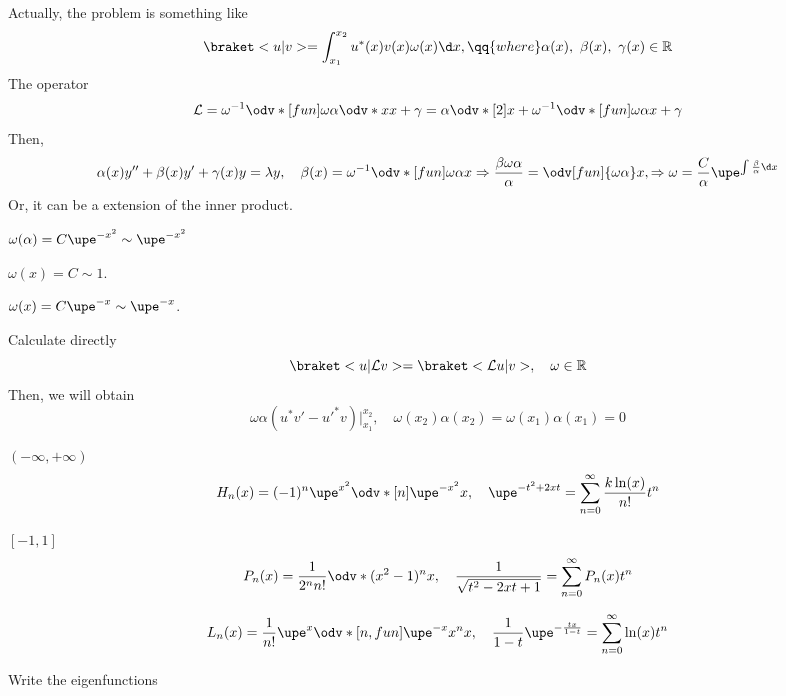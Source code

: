 \begin{problem}
\end{problem}
\begin{solution}[By TA]\leavevmode
  \begin{enumext}
    \item Actually, the problem is something like
    \[
      \braket<u|v> = \int_{x_1}^{x_2} u^*(x) v(x) \omega(x) \d x, \qq{where}
      \alpha(x),\ \beta(x),\ \gamma(x) \in \mathbb R
    \]
    The operator
    \[
      \mathcal L = \omega^{-1} \odv*[fun]{\omega\alpha \odv*{}x}x + \gamma
    = \alpha \odv*[2]{}x + \omega^{-1} \odv*[fun]{\omega\alpha}x + \gamma
    \]
    Then,
    \[
      \alpha(x)y'' + \beta(x)y' + \gamma(x)y = \lambda y, \quad
      \beta(x) = \omega^{-1} \odv*[fun]{\omega\alpha}x \Rightarrow
      \frac{\beta\omega\alpha}{\alpha} = \odv[fun]{\omega\alpha}x, \Rightarrow
      \omega = \frac C\alpha \upe^{\int\frac\beta\alpha \d x}
    \]
    Or, it can be a extension of the inner product.
    \begin{enumext}[columns = 3]
      \item $\omega(\alpha) = C\upe^{-x^2} \sim \upe^{-x^2}$
      \item $\omega(x) = C \sim 1$.
      \item $\omega(x) = C\upe^{-x} \sim \upe^{-x}$.
    \end{enumext}
    \item Calculate directly
    \[
      \braket<u|\mathcal Lv> = \braket<\mathcal Lu|v>, \quad
      \omega \in \mathbb R
    \]
    Then, we will obtain
    \[
      \mathcal \omega\alpha(u^*v' - u'^*v)\big|_{x_1}^{x_2}, \quad
      \omega(x_2)\alpha(x_2) = \omega(x_1)\alpha(x_1) = 0
    \]
    \begin{enumext}
      \item $(-\infty, +\infty)$
      \[
        H_n(x) = (-1)^n \upe^{x^2} \odv*[n]{\upe^{-x^2}}x, \quad
        \upe^{-t^2+2xt} = \sum_{n=0}^\infty \frac{k\ln(x)}{n!}t^n
      \]
      \item $[-1, 1]$
      \[
        P_n(x) = \frac1{2^nn!} \odv*{(x^2 - 1)^n}x, \quad
        \frac1{\sqrt{t^2 - 2xt + 1}} = \sum_{n=0}^\infty P_n(x)t^n
      \]
      \item 
      \[
        L_n(x) = \frac1{n!} \upe^x \odv*[n,fun]{\upe^{-x} x^n}x, \quad
        \frac1{1 - t} \upe^{-\frac{tx}{1-t}} = \sum_{n=0}^\infty \ln(x) t^n
      \]
    \end{enumext}
    \item Write the eigenfunctions

\end{enumext}
\end{solution}
